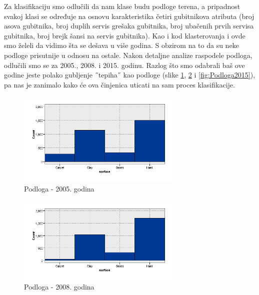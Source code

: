 \documentclass[a4paper]{article}
\begin{document}
Za klasifikaciju smo odlučili da nam klase budu podloge terena, a pripadnost svakoj klasi se određuje na osnovu karakteristika četiri gubitnikova atributa (broj asova gubitnika, broj duplih servis grešaka gubitnika, broj ubačenih prvih servisa gubitnika, broj brejk šansi na servis gubitnika). Kao i kod klasterovanja i ovde smo želeli da vidimo šta se dešava u više godina. S obzirom na to da su neke podloge prisutnije u odnosu na ostale. Nakon detaljne analize raspodele podloga, odlučili smo se za 2005., 2008. i 2015. godinu. Razlog što smo odabrali baš ove godine jeste polako gubljenje ˝tepiha˝ kao podloge (slike \ref{fig:Podloga2005}, \ref{fig:Podloga2008} i \ref{fig:Podloga2015}), pa nas je zanimalo kako će ova činjenica uticati na sam proces klasifikacije. 

\begin{figure}[H]
	\begin{center}
		\includegraphics[width=0.7\textwidth]{Klasifikacija/HistogramiPodlogaTerena/Graphboard2005.png}
	\end{center}
	\caption{Podloga - 2005. godina}
	\label{fig:Podloga2005}
\end{figure}
\begin{figure}[H]
	\begin{center}
		\includegraphics[width=0.7\textwidth]{Klasifikacija/HistogramiPodlogaTerena/Graphboard2008.png}
	\end{center}
	\caption{Podloga - 2008. godina}
	\label{fig:Podloga2008}
\end{figure}
\end{document}

